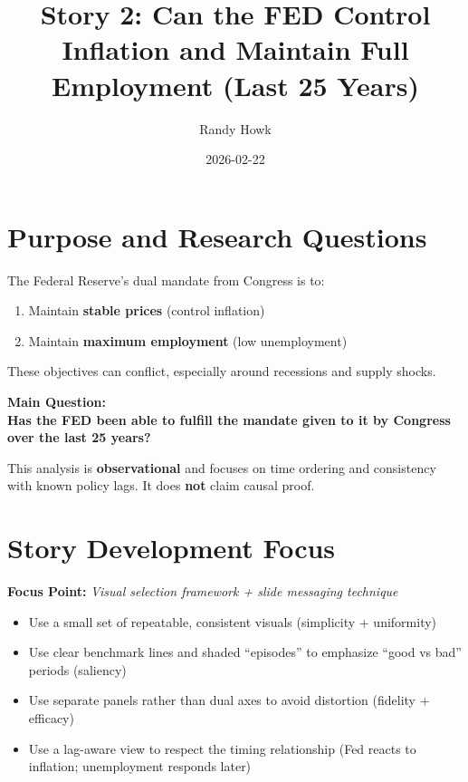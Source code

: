 \documentclass[
  11pt,
]{article}
\title{Story 2: Can the FED Control Inflation and Maintain Full
Employment (Last 25 Years)}
\author{Randy Howk}
\date{2026-02-22}
\providecommand{\tightlist}{%
  \setlength{\itemsep}{0pt}\setlength{\parskip}{0pt}}
\begin{document}
\maketitle

{
\setcounter{tocdepth}{2}
\tableofcontents
}
\section{Purpose and Research
Questions}\label{purpose-and-research-questions}

The Federal Reserve's dual mandate from Congress is to:

\begin{enumerate}
\def\labelenumi{\arabic{enumi}.}
\tightlist
\item
  Maintain \textbf{stable prices} (control inflation)\\
\item
  Maintain \textbf{maximum employment} (low unemployment)
\end{enumerate}

These objectives can conflict, especially around recessions and supply
shocks.

\textbf{Main Question:}\\
\textbf{Has the FED been able to fulfill the mandate given to it by
Congress over the last 25 years?}

This analysis is \textbf{observational} and focuses on time ordering and
consistency with known policy lags. It does \textbf{not} claim causal
proof.

\section{Story Development Focus}\label{story-development-focus}

\textbf{Focus Point:} \emph{Visual selection framework + slide messaging
technique}

\begin{itemize}
\tightlist
\item
  Use a small set of repeatable, consistent visuals (simplicity +
  uniformity)
\item
  Use clear benchmark lines and shaded ``episodes'' to emphasize ``good
  vs bad'' periods (saliency)
\item
  Use separate panels rather than dual axes to avoid distortion
  (fidelity + efficacy)
\item
  Use a lag-aware view to respect the timing relationship (Fed reacts to
  inflation; unemployment responds later)
\end{itemize}
\end{document}

